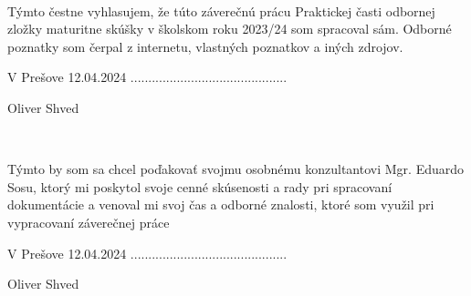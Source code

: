 \thispagestyle{empty}
\begin{center}
   \\
\end{center}
\vspace{2cm}
Týmto čestne vyhlasujem, že túto záverečnú prácu Praktickej časti odbornej zložky maturitne skúšky v školskom roku 2023/24 som spracoval sám. Odborné poznatky som čerpal z internetu, vlastných poznatkov a iných zdrojov. \\

\vspace{2cm}

V Prešove 12.04.2024 \hspace*{5cm}  ............................................

\begin{adjustwidth}{0}{2cm}
  \begin{flushright}
    Oliver Shved
  \end{flushright}
\end{adjustwidth}

\emptypage


\begin{center}
   \\
\end{center}
\vspace{2cm}
Týmto by som sa chcel poďakovať svojmu osobnému konzultantovi Mgr. Eduardo Sosu, ktorý mi poskytol svoje cenné skúsenosti a rady pri spracovaní dokumentácie a venoval mi svoj čas a odborné znalosti, ktoré som využil pri vypracovaní záverečnej práce \\

\vspace{2cm}

V Prešove 12.04.2024 \hspace*{5cm}  ............................................

\begin{adjustwidth}{0}{2cm}
  \begin{flushright}
    Oliver Shved
  \end{flushright}
\end{adjustwidth}

